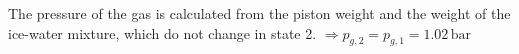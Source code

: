 The pressure of the gas is calculated from the piston weight and the weight of the ice-water mixture, which do not change in state 2.  
\( \Rightarrow p_{g,2} = p_{g,1} = 1.02 \, \text{bar} \)